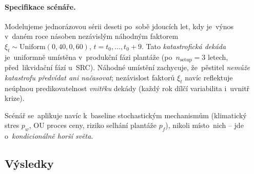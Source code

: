 \paragraph{Specifikace scénáře.}
Modelujeme jednorázovou sérii deseti po~sobě jdoucích let, kdy je~výnos
v~daném roce násoben nezávislým náhodným faktorem
\(\xi_t \sim \mathrm{Uniform}(0{,}40, 0{,}60)\), $t = t_0, \dots, t_0 + 9$.
Tato \emph{katastrofická dekáda} je~uniformně umístěna v~produkční fázi
plantáže (po~$n_{\mathrm{setup}} = 3$ letech, před~likvidační fází
u~SRC). Náhodné umístění zachycuje, že~pěstitel \emph{nemůže katastrofu
předvídat ani načasovat}; nezávislost faktorů $\xi_t$ navíc reflektuje
neúplnou predikovatelnost \emph{vnitřku} dekády (každý rok dílčí variabilita
i~uvnitř krize).

Scénář se~aplikuje navíc k~baseline stochastickým mechanismům
(klimatický stres $p_w$, OU proces ceny, riziko selhání plantáže $p_f$),
nikoli místo~nich -- jde o~\emph{kondicionálně horší světa}.

\subsection{Výsledky}
\label{subsec:katastrofa-vysledky}


